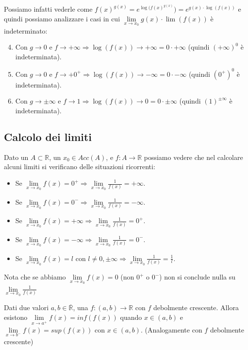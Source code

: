 Possiamo infatti vederle come $f(x)^{g(x)} = e^{\log(f(x)^{g(x)}}) = e^{g(x) \cdot \log(f(x))}$ e quindi possiamo analizzare i casi in cui $\lim\limits_{x\to x_0}g(x) \cdot \lim(f(x))$ è indeterminato:
\begin{enumerate}
    \setcounter{enumi}{3}
    \item Con $g\to 0$ e $f\to +\infty \Longrightarrow \log(f(x)) \to +\infty = 0 \cdot +\infty$ (quindi $(+\infty)^0$ è indeterminata).
    \item Con $g\to 0$ e $f\to +0^+ \Longrightarrow \log(f(x)) \to -\infty = 0 \cdot -\infty$ (quindi $(0^+)^0$ è indeterminata).
    \item Con $g\to \pm\infty$ e $f\to 1 \Longrightarrow \log(f(x)) \to 0 = 0 \cdot \pm\infty$ (quindi $(1)^{\pm\infty}$ è indeterminata).
\end{enumerate}

\subsection{Calcolo dei limiti}
\begin{proposition}
Dato un $A \subset \mathbb{R}$, un $x_0 \in Acc(A)$, e $f: A \to \mathbb{R}$ possiamo vedere che nel calcolare alcuni limiti si verificano delle situazioni ricorrenti:
\begin{itemize}
    \item Se $\lim\limits_{x\to x_0}f(x) = 0^+ \Longrightarrow \lim\limits_{x\to x_0}\frac{1}{f(x)} = +\infty$.
    \item Se $\lim\limits_{x\to x_0}f(x) = 0^- \Longrightarrow \lim\limits_{x\to x_0}\frac{1}{f(x)} = -\infty$.
    \item Se $\lim\limits_{x\to x_0}f(x) = +\infty \Longrightarrow \lim\limits_{x\to x_0}\frac{1}{f(x)} = 0^+$.
    \item Se $\lim\limits_{x\to x_0}f(x) = -\infty \Longrightarrow \lim\limits_{x\to x_0}\frac{1}{f(x)} = 0^-$.
    \item Se $\lim\limits_{x\to x_0}f(x) = l$ con $l \neq 0, \pm\infty \Longrightarrow \lim\limits_{x\to x_0}\frac{1}{f(x)} = \frac{1}{l}$.
\end{itemize}
\end{proposition}
\begin{note}
Nota che se abbiamo $\lim\limits_{x\to x_0}f(x) = 0$ (non $0^+$ o $0^-$) non si conclude nulla su $\lim\limits_{x\to x_0}\frac{1}{f(x)}$
\end{note}

\begin{proposition}
Dati due valori $a,b \in \overline{\mathbb{R}}$, una $f:(a,b) \to \mathbb{R}$ con $f$ debolmente crescente. Allora esistono $\lim\limits_{x\to a^+}f(x) = inf(f(x))$ quando $x \in (a,b)$ e $\lim\limits_{x\to b^-}f(x) = sup(f(x))$ con $x \in (a,b)$. (Analogamente con $f$ debolmente crescente)
\end{proposition}

